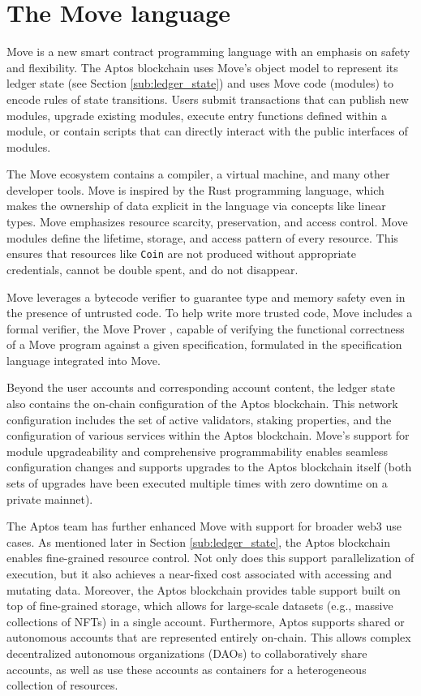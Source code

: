\documentclass{article}
\begin{document}
\section{The Move language}
\label{sec:move}
Move is a new smart contract programming language with an emphasis on safety and flexibility. The Aptos blockchain uses Move's object model to represent its ledger state (see Section \ref{sub:ledger_state}) and uses Move code (modules) to encode rules of state transitions. Users submit transactions that can publish new modules, upgrade existing modules, execute entry functions defined within a module, or contain scripts that can directly interact with the public interfaces of modules.

The Move ecosystem contains a compiler, a virtual machine, and many other developer tools. Move is inspired by the Rust programming language, which makes the ownership of data explicit in the language via concepts like linear types. Move emphasizes resource scarcity, preservation, and access control. Move modules define the lifetime, storage, and access pattern of every resource. This ensures that resources like \texttt{Coin} are not produced without appropriate credentials, cannot be double spent, and do not disappear. 

Move leverages a bytecode verifier to guarantee type and memory safety even in the presence of untrusted code. To help write more trusted code, Move includes a formal verifier, the Move Prover \cite{move_prover}, capable of verifying the functional correctness of a Move program against a given specification, formulated in the specification language integrated into Move.

Beyond the user accounts and corresponding account content, the ledger state also contains the on-chain configuration of the Aptos blockchain. This network configuration includes the set of active validators, staking properties, and the configuration of various services within the Aptos blockchain. Move's support for module upgradeability and comprehensive programmability enables seamless configuration changes and supports upgrades to the Aptos blockchain itself (both sets of upgrades have been executed multiple times with zero downtime on a private mainnet).

The Aptos team has further enhanced Move with support for broader web3 use cases. As mentioned later in Section \ref{sub:ledger_state}, the Aptos blockchain enables fine-grained resource control. Not only does this support parallelization of execution, but it also achieves a near-fixed cost associated with accessing and mutating data. Moreover, the Aptos blockchain provides table support built on top of fine-grained storage, which allows for large-scale datasets (e.g., massive collections of NFTs) in a single account. Furthermore, Aptos supports shared or autonomous accounts that are represented entirely on-chain. This allows complex decentralized autonomous organizations (DAOs) to collaboratively share accounts, as well as use these accounts as containers for a heterogeneous collection of resources.
\end{document}
